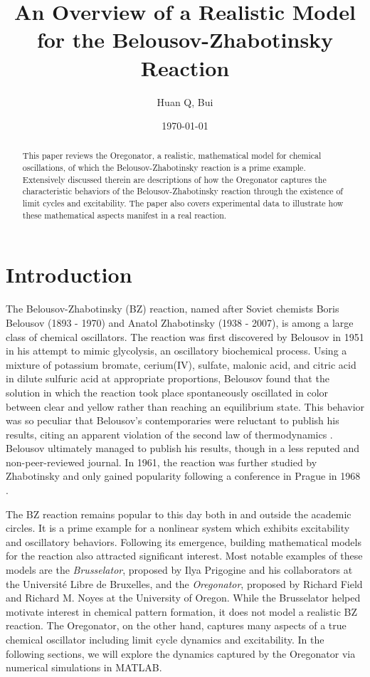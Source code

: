 \documentclass[twocolumn,amsmath,amssymb,aps]{revtex4}
\begin{document}
\title{An Overview of a Realistic Model for the Belousov-Zhabotinsky Reaction}%
\author{Huan Q, Bui}
\date{\today}
\begin{abstract}
This paper reviews the Oregonator, a realistic, mathematical model for chemical oscillations, of which the Belousov-Zhabotinsky reaction is a prime example. Extensively discussed therein are descriptions of how the Oregonator captures the characteristic behaviors of the Belousov-Zhabotinsky reaction through the existence of limit cycles and excitability. The paper also covers experimental data to illustrate how these mathematical aspects manifest in a real reaction. 
\end{abstract}
\maketitle




\section{Introduction}
The Belousov-Zhabotinsky (BZ) reaction, named after Soviet chemists Boris Belousov (1893 - 1970) and Anatol Zhabotinsky (1938 - 2007), is among a large class of chemical oscillators. The reaction was first discovered by Belousov in 1951 in his attempt to mimic glycolysis, an oscillatory biochemical process. Using a mixture of potassium bromate, cerium(IV), sulfate, malonic acid, and citric acid in dilute sulfuric acid at appropriate proportions, Belousov found that the solution in which the reaction took place spontaneously oscillated in color between clear and yellow rather than reaching an equilibrium state. This behavior was so peculiar that Belousov's contemporaries were reluctant to publish his results, citing an apparent violation of the second law of thermodynamics \cite{ball1999self}. Belousov ultimately managed to publish his results, though in a less reputed and non-peer-reviewed journal. In 1961, the reaction was further studied by Zhabotinsky and only gained popularity following a conference in Prague in 1968 \cite{doi:10.1021/ed061p661}.

The BZ reaction remains popular to this day both in and outside the academic circles. It is a prime example for a nonlinear system which exhibits excitability and oscillatory behaviors. Following its emergence, building mathematical models for the reaction also attracted significant interest. Most notable examples of these models are the \textit{Brusselator}, proposed by Ilya Prigogine and his collaborators at the Université Libre de Bruxelles, and the \textit{Oregonator}, proposed by Richard Field and Richard M. Noyes at the University of Oregon. While the Brusselator helped motivate interest in chemical pattern formation, it does not model a realistic BZ reaction. The Oregonator, on the other hand, captures many aspects of a true chemical oscillator including limit cycle dynamics and excitability. In the following sections, we will explore the dynamics captured by the Oregonator via numerical simulations in MATLAB. 
\end{document}
